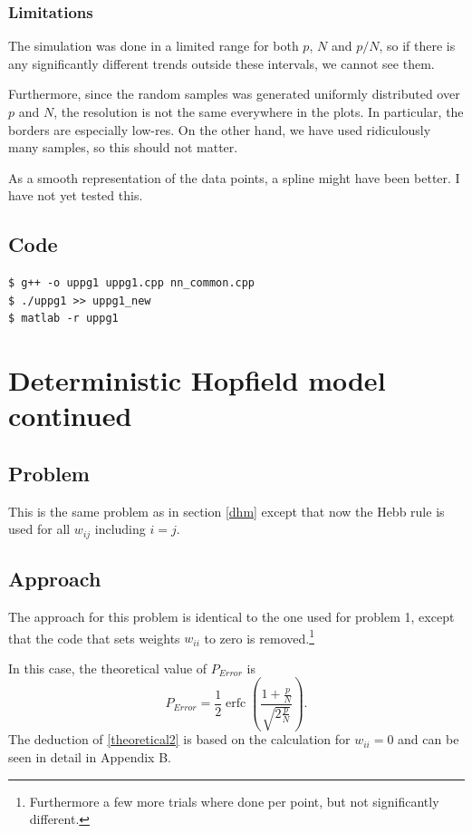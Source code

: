 \documentclass[12pt,a4paper]{article}
\begin{document}
\subsubsection{Limitations}

The simulation was done in a limited range for both $p$, $N$ and $p/N$, so if there is any significantly different trends outside these intervals, we cannot see them.

Furthermore, since the random samples was generated uniformly distributed over $p$ and $N$, the resolution is not the same everywhere in the plots. In particular, the borders are especially low-res. On the other hand, we have used ridiculously many samples, so this should not matter.

As a smooth representation of the data points, a spline might have been better. I have not yet tested this.

\subsection{Code}
 
\begin{verbatim}
$ g++ -o uppg1 uppg1.cpp nn_common.cpp
$ ./uppg1 >> uppg1_new
$ matlab -r uppg1
\end{verbatim}

\section{Deterministic Hopfield model continued}

\subsection{Problem}
This is the same problem as in section \ref{dhm} except that now the Hebb
rule is used for all $w_{ij}$ including $i = j$.

\subsection{Approach}
The approach for this problem is identical to the one used for problem 1,
except that the code that sets weights $w_{ii}$ to zero is
removed.\footnote{Furthermore a few more trials where done per point, but
not significantly different.} 

In this case, the theoretical value of $P_{Error}$ is
\begin{equation} \label{theoretical2}
P_{Error} = \frac{1}{2} \operatorname{erfc}(\frac{1 + \frac{p}{N}}{\sqrt{2 \frac{p}{N}}}).
\end{equation}
The deduction of \eqref{theoretical2} is based on the
calculation for $w_{ii} = 0$ and can be seen in detail in Appendix B.
\end{document}
